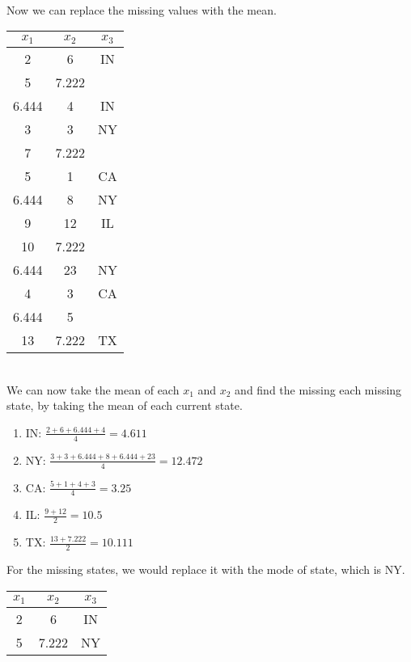 \documentclass{article}
\begin{document}
\begin{enumerate}[label=\alph*)]
    \\ Now we can replace the missing values with the mean.
    \begin{table}[ht]
        \centering
        \begin{tabular}{|c|c|c|} 
        \hline
        $x_1$ & $x_2$ & $x_3$ \\
        \hline
        2 & 6 & IN \\\hline
        5 & 7.222 &  \\\hline
        6.444 & 4 & IN \\\hline
        3 & 3 & NY \\\hline
        7 & 7.222 &  \\\hline
        5 & 1 & CA \\\hline
        6.444 & 8 & NY \\\hline
        9 & 12 &  IL\\\hline
        10 & 7.222 &  \\\hline
        6.444 & 23 & NY \\\hline
        4 & 3 &  CA\\\hline
        6.444 & 5 &  \\\hline
        13 & 7.222 & TX \\\hline
        \end{tabular}
    \end{table}
    \\We can now take the mean of each $x_1$ and $x_2$ and find the missing each missing state, by taking the mean of each current state.
    \begin{enumerate}
        \item IN: $\frac{2+6+6.444+4}{4} = 4.611$
        \item NY: $\frac{3+3+6.444+8+6.444+23}{4} = 12.472$
        \item CA: $\frac{5+1+4+3}{4} = 3.25$
        \item IL: $\frac{9+12}{2} = 10.5$
        \item TX: $\frac{13+7.222}{2} = 10.111$
    \end{enumerate}
    For the missing states, we would replace it with the mode of state, which is NY.
    \begin{table}[ht]
        \centering
        \begin{tabular}{|c|c|c|} 
        \hline
        $x_1$ & $x_2$ & $x_3$ \\
        \hline
        2 & 6 & IN \\\hline
        5 & 7.222 &  NY \\\hline

\end{tabular}
\end{table}
\end{enumerate}
\end{document}
